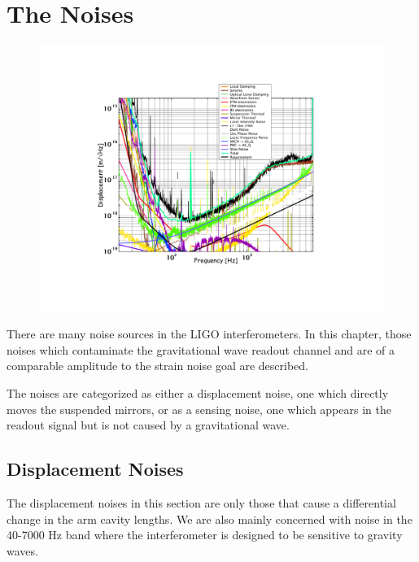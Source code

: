 \chapter{The Noises}
\label{chap:noise}

\begin{figure}[!h]
\centerline{\includegraphics[angle=0,width=6.5in]{Figures/Chap4/S3noise.pdf}}
\end{figure}
\clearpage

There are many noise sources in the LIGO interferometers. In this chapter,
those noises which contaminate the gravitational wave readout channel and are 
of a comparable amplitude to the strain noise goal are described.

The noises are categorized as either a displacement noise, one which directly
moves the suspended mirrors, or as a sensing noise, one which appears in the
readout signal but is not caused by a gravitational wave.



\section{Displacement Noises}
The displacement noises in this section are only those that cause a differential
change in the arm cavity lengths. We are also mainly concerned with noise in
the 40-7000 Hz band where the interferometer is designed to be sensitive to
gravity waves.


